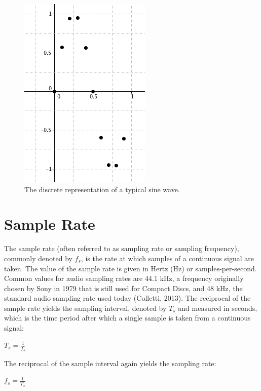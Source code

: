 \documentclass[12pt]{report}
\begin{document}
\begin{figure}[h!]

  \centering

  \includegraphics[scale=0.5]{img/disc}

  \caption{The discrete representation of a typical sine wave.}

  \label{fig:disc}

\end{figure}

\section{Sample Rate}

The sample rate (often referred to as sampling rate or sampling frequency), commonly denoted by $f_{s}$, is the rate at which samples of a continuous signal are taken. The value of the sample rate is given in Hertz (Hz) or samples-per-second. Common values for audio sampling rates are 44.1 kHz, a frequency originally chosen by Sony in 1979 that is still used for Compact Discs, and 48 kHz, the standard audio sampling rate used today  (Colletti, 2013). The reciprocal of the sample rate yields the sampling interval, denoted by $T_{s}$ and measured in seconds, which is the time period after which a single sample is taken from a continuous signal:\begin{center} $T_{s} = \frac{1}{f_{s}}$ \end{center} The reciprocal of the sample interval again yields the sampling rate: \begin{center} $f_{s} = \frac{1}{T_{s}}$ \end{center}
\end{document}
